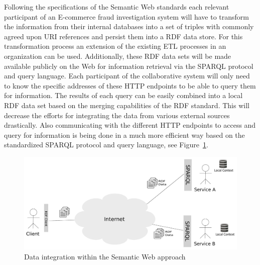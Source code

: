 Following the specifications of the Semantic Web standards each relevant participant of an \gls{E-commerce} fraud investigation system will have to transform the information from their internal databases into a set of triples with commonly agreed upon \gls{URI} references and persist them into a \gls{RDF} data store. For this transformation process an extension of the existing \gls{ETL} processes in an organization can be used. Additionally, these \gls{RDF} data sets will be made available publicly on the Web for information retrieval via the \gls{SPARQL} protocol and query language. Each participant of the collaborative system will only need to know the specific addresses of these \gls{HTTP} endpoints to be able to query them for information. The results of each query can be easily combined into a local \gls{RDF} data set based on the merging capabilities of the \gls{RDF} standard. This will decrease the efforts for integrating the data from various external sources drastically. Also communicating with the different \gls{HTTP} endpoints to access and query for information is being done in a much more efficient way based on the standardized \gls{SPARQL} protocol and query language, see Figure~\ref{fig:web_data_scenario}. \@

\begin{figure}[H]
  \centering
  \includegraphics[width=0.9\columnwidth]{images/web-data-scenario.pdf}
  \caption{Data integration within the Semantic Web approach}
\label{fig:web_data_scenario}
\end{figure}

